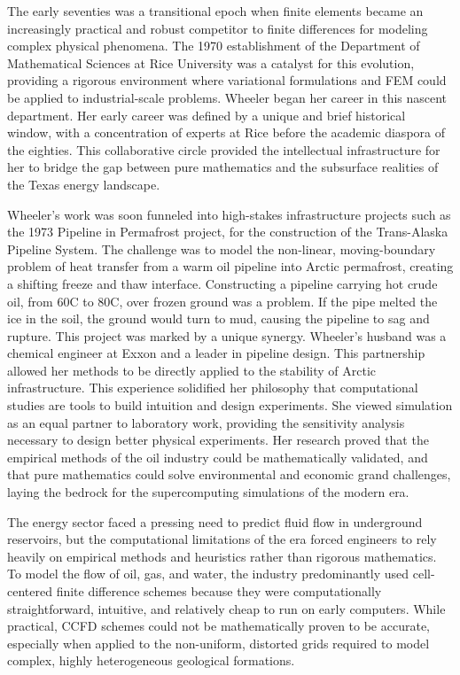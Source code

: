The early seventies was a transitional epoch when finite elements became an increasingly practical and robust competitor to finite differences for modeling complex physical phenomena. The 1970 establishment of the Department of Mathematical Sciences at Rice University was a catalyst for this evolution, providing a rigorous environment where variational formulations and FEM could be applied to industrial-scale problems. Wheeler began her career in this nascent department. Her early career was defined by a unique and brief historical window, with a concentration of experts at Rice before the academic diaspora of the eighties. This collaborative circle provided the intellectual infrastructure for her to bridge the gap between pure mathematics and the subsurface realities of the Texas energy landscape.

Wheeler’s work was soon funneled into high-stakes infrastructure projects such as the 1973 Pipeline in Permafrost project, for the construction of the Trans-Alaska Pipeline System. The challenge was to model the non-linear, moving-boundary problem of heat transfer from a warm oil pipeline into Arctic permafrost, creating a shifting freeze and thaw interface. Constructing a pipeline carrying hot crude oil, from 60C to 80C, over frozen ground was a problem. If the pipe melted the ice in the soil, the ground would turn to mud, causing the pipeline to sag and rupture. This project was marked by a unique synergy. Wheeler’s husband was a chemical engineer at Exxon and a leader in pipeline design. This partnership allowed her methods to be directly applied to the stability of Arctic infrastructure. This experience solidified her philosophy that computational studies are tools to build intuition and design experiments. She viewed simulation as an equal partner to laboratory work, providing the sensitivity analysis necessary to design better physical experiments. Her research proved that the empirical methods of the oil industry could be mathematically validated, and that pure mathematics could solve environmental and economic grand challenges, laying the bedrock for the supercomputing simulations of the modern era.

The energy sector faced a pressing need to predict fluid flow in underground reservoirs, but the computational limitations of the era forced engineers to rely heavily on empirical methods and heuristics rather than rigorous mathematics. To model the flow of oil, gas, and water, the industry predominantly used cell-centered finite difference schemes because they were computationally straightforward, intuitive, and relatively cheap to run on early computers. While practical, CCFD schemes could not be mathematically proven to be accurate, especially when applied to the non-uniform, distorted grids required to model complex, highly heterogeneous geological formations. 

